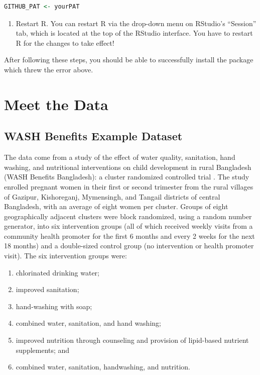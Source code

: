 \documentclass[12pt, krantz2,]{krantz}
\providecommand{\tightlist}{%
  \setlength{\itemsep}{0pt}\setlength{\parskip}{0pt}}
\theoremstyle{definition}
\theoremstyle{definition}
\theoremstyle{definition}
\newcommand{\1}{\mathbbm{1}}
\begin{document}
\begin{lstlisting}[language=R]
GITHUB_PAT <- yourPAT
\end{lstlisting}

\begin{enumerate}
\def\labelenumi{\arabic{enumi}.}
\setcounter{enumi}{7}
\tightlist
\item
  Restart R. You can restart R via the drop-down menu on RStudio's ``Session''
  tab, which is located at the top of the RStudio interface. You have to
  restart R for the changes to take effect!
\end{enumerate}

After following these steps, you should be able to successfully install the
package which threw the error above.

\hypertarget{data}{%
\chapter{Meet the Data}\label{data}}

\hypertarget{wash}{%
\section{WASH Benefits Example Dataset}\label{wash}}

The data come from a study of the effect of water quality, sanitation, hand
washing, and nutritional interventions on child development in rural Bangladesh
(WASH Benefits Bangladesh): a cluster randomized controlled trial
\citep{luby2018effect}. The study enrolled pregnant women in their first or second
trimester from the rural villages of Gazipur, Kishoreganj, Mymensingh, and
Tangail districts of central Bangladesh, with an average of eight women per
cluster. Groups of eight geographically adjacent clusters were block randomized,
using a random number generator, into six intervention groups (all of which
received weekly visits from a community health promoter for the first 6 months
and every 2 weeks for the next 18 months) and a double-sized control group (no
intervention or health promoter visit). The six intervention groups were:

\begin{enumerate}
\def\labelenumi{\arabic{enumi}.}
\tightlist
\item
  chlorinated drinking water;
\item
  improved sanitation;
\item
  hand-washing with soap;
\item
  combined water, sanitation, and hand washing;
\item
  improved nutrition through counseling and provision of lipid-based nutrient
  supplements; and
\item
  combined water, sanitation, handwashing, and nutrition.
\end{enumerate}
\end{document}
